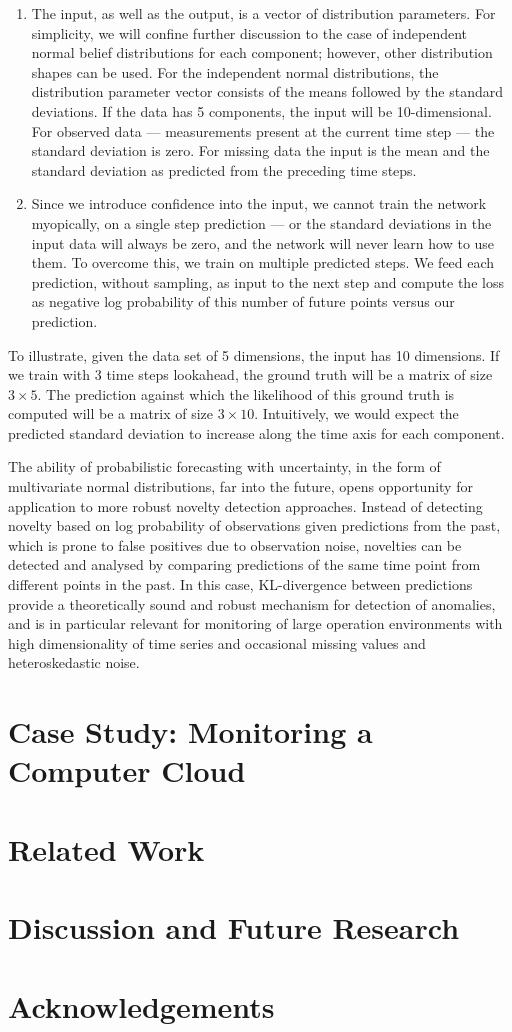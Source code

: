 \documentclass[runningheads]{llncs}
\begin{document}
\begin{enumerate}
\item The input, as well as the output, is a vector of
distribution parameters. For simplicity, we will confine further
discussion to the case of independent normal belief
distributions for each component; however, other distribution
shapes can be used. For the independent normal
distributions, the distribution parameter vector consists of the
means followed by the standard deviations. If the data has 5
components, the input will be 10-dimensional. For observed data
--- measurements present at the current time step --- the
standard deviation is zero. For missing data the input is the
mean and the standard deviation as predicted from the preceding
time steps.

\item Since we introduce confidence into the input, we cannot
train the network myopically, on a single step prediction --- or
the standard deviations in the input data will always be zero,
and the network will never learn how to use them. To overcome
this, we train on multiple predicted steps. We feed each
prediction, without sampling, as input to the next step and
compute the loss as negative log probability of this number of
future points versus our prediction.
\end{enumerate}

To illustrate, given the data set of 5 dimensions, the input has 10
dimensions. If we train with 3 time steps lookahead, the ground
truth will be a matrix of size $3\times 5$. The prediction against
which the likelihood of this ground truth is computed will be
a matrix of size $3 \times 10$. Intuitively, we would expect the
predicted standard deviation to increase along the time axis
for each component.

The ability of probabilistic forecasting with uncertainty, in
the form of multivariate normal distributions, far into the
future, opens opportunity for application to more robust
novelty detection approaches. Instead of detecting novelty based
on log probability of observations given predictions from the
past, which is prone to false positives due to observation
noise, novelties can be detected and analysed by comparing
predictions of the same time point from different points in the
past. In this case, KL-divergence between predictions provide a
theoretically sound and robust mechanism for detection of
anomalies, and is in particular relevant for monitoring of large
operation environments with high dimensionality of time series
and occasional missing values and heteroskedastic noise.

\section{Case Study: Monitoring a Computer Cloud}


\section{Related Work} 

\section{Discussion and Future Research}

\section*{Acknowledgements}



\end{document}
